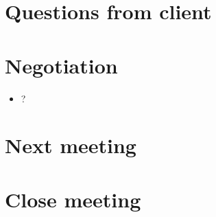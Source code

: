 \documentclass[11pt, a4paper]{article}
\begin{document}
\section{Questions from client}

\section{Negotiation}
\begin{itemize}
	\item ?
\end{itemize}

\section{Next meeting}

\section {Close meeting}
\vspace*{10pt}
\end{document}
